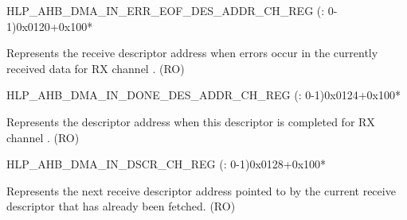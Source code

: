 \begin{register}{H}{LP\_AHB\_DMA\_IN\_ERR\_EOF\_DES\_ADDR\_CH\_REG (: 0-1)}{0x0120+0x100*}\label{regdesc:LPAHBDMAINERREOFDESADDRCHNREG}
%
\regnewline%
\begin{regdesc}\begin{reglist}
\label{fielddesc:LPAHBDMAINERREOFDESADDRCHN}\item [LP\_AHB\_DMA\_IN\_ERR\_EOF\_DES\_ADDR\_CH\regindex{n}] Represents the receive descriptor address when errors occur in the currently received data for RX channel . (RO)
\end{reglist}\end{regdesc}
\end{register}


\begin{register}{H}{LP\_AHB\_DMA\_IN\_DONE\_DES\_ADDR\_CH\_REG (: 0-1)}{0x0124+0x100*}\label{regdesc:LPAHBDMAINDONEDESADDRCHNREG}
%
\regnewline%
\begin{regdesc}\begin{reglist}
\label{fielddesc:LPAHBDMAINDONEDESADDRCHN}\item [LP\_AHB\_DMA\_IN\_DONE\_DES\_ADDR\_CH\regindex{n}] Represents the descriptor address when this descriptor is completed for RX channel . (RO)
\end{reglist}\end{regdesc}
\end{register}


\begin{register}{H}{LP\_AHB\_DMA\_IN\_DSCR\_CH\_REG (: 0-1)}{0x0128+0x100*}\label{regdesc:LPAHBDMAINDSCRCHNREG}
%
\regnewline%
\begin{regdesc}\begin{reglist}
\label{fielddesc:LPAHBDMAINLINKDSCRCHN}\item [LP\_AHB\_DMA\_INLINK\_DSCR\_CH\regindex{n}] Represents the next receive descriptor address pointed to by the current receive descriptor that has already been fetched. (RO)
\end{reglist}\end{regdesc}
\end{register}


